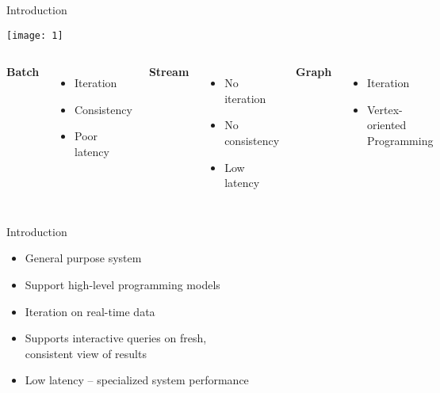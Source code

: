 \begin{frame}[t]{Introduction}
  \vspace{-0.70cm}
  \begin{center}
    \texttt{[image: 1]}
  \end{center}

  \pause
  \begin{columns}[t]
    \hspace{0.09\textwidth}
      \textbf{Batch}
      \begin{itemize}
        \item Iteration
        \item Consistency
        \item Poor latency
      \end{itemize}
    
      \textbf{Stream}
      \begin{itemize}
        \item No iteration
        \item No consistency
        \item Low latency
      \end{itemize}

      \textbf{Graph}
      \begin{itemize}
        \item Iteration
        \item Vertex-oriented Programming
      \end{itemize}
  \end{columns}
\end{frame}

\begin{frame}[t]{Introduction}
  \vspace{0.25cm}

  \begin{itemize}
    \setlength\itemsep{0.15cm}
    \item General purpose system
    \item Support high-level programming models
    \item Iteration on real-time data
    \item Supports interactive queries on fresh,\\ consistent view of results
    \item Low latency -- specialized system performance
  \end{itemize}
\end{frame}

